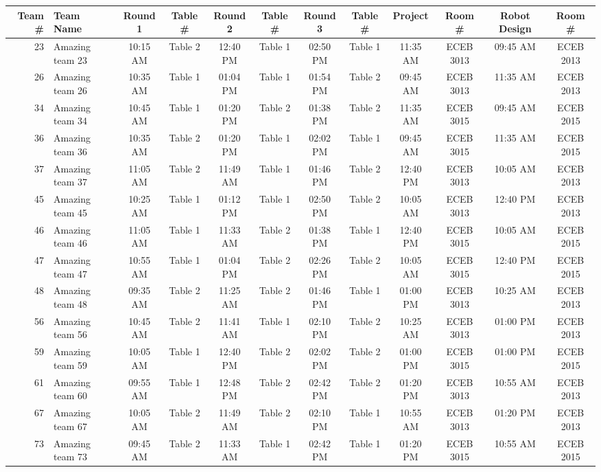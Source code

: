 \documentclass{article}%
\begin{document}
%
\normalsize%
\sffamily%
\def\arraystretch{1.5}%
%
\begin{tabular}{|rl|cc|cc|cc|cc|cc|}%
\hline%
\textbf{Team \#}&\textbf{Team Name}&\textbf{Round 1}&\textbf{Table \#}&\textbf{Round 2}&\textbf{Table \#}&\textbf{Round 3}&\textbf{Table \#}&\textbf{Project}&\textbf{Room \#}&\textbf{Robot Design}&\textbf{Room \#}\\%
\hline%
23&Amazing team 23&10:15 AM&Table 2&12:40 PM&Table 1&02:50 PM&Table 1&11:35 AM&ECEB 3013&09:45 AM&ECEB 2013\\%
\hline%
26&Amazing team 26&10:35 AM&Table 1&01:04 PM&Table 1&01:54 PM&Table 2&09:45 AM&ECEB 3013&11:35 AM&ECEB 2013\\%
\hline%
34&Amazing team 34&10:45 AM&Table 1&01:20 PM&Table 2&01:38 PM&Table 2&11:35 AM&ECEB 3015&09:45 AM&ECEB 2015\\%
\hline%
36&Amazing team 36&10:35 AM&Table 2&01:20 PM&Table 1&02:02 PM&Table 1&09:45 AM&ECEB 3015&11:35 AM&ECEB 2015\\%
\hline%
37&Amazing team 37&11:05 AM&Table 2&11:49 AM&Table 1&01:46 PM&Table 2&12:40 PM&ECEB 3013&10:05 AM&ECEB 2013\\%
\hline%
45&Amazing team 45&10:25 AM&Table 1&01:12 PM&Table 1&02:50 PM&Table 2&10:05 AM&ECEB 3013&12:40 PM&ECEB 2013\\%
\hline%
46&Amazing team 46&11:05 AM&Table 1&11:33 AM&Table 2&01:38 PM&Table 1&12:40 PM&ECEB 3015&10:05 AM&ECEB 2015\\%
\hline%
47&Amazing team 47&10:55 AM&Table 1&01:04 PM&Table 2&02:26 PM&Table 2&10:05 AM&ECEB 3015&12:40 PM&ECEB 2015\\%
\hline%
48&Amazing team 48&09:35 AM&Table 2&11:25 AM&Table 2&01:46 PM&Table 1&01:00 PM&ECEB 3013&10:25 AM&ECEB 2013\\%
\hline%
56&Amazing team 56&10:45 AM&Table 2&11:41 AM&Table 1&02:10 PM&Table 2&10:25 AM&ECEB 3013&01:00 PM&ECEB 2013\\%
\hline%
59&Amazing team 59&10:05 AM&Table 1&12:40 PM&Table 2&02:02 PM&Table 2&01:00 PM&ECEB 3015&01:00 PM&ECEB 2015\\%
\hline%
61&Amazing team 60&09:55 AM&Table 1&12:48 PM&Table 2&02:42 PM&Table 2&01:20 PM&ECEB 3013&10:55 AM&ECEB 2013\\%
\hline%
67&Amazing team 67&10:05 AM&Table 2&11:49 AM&Table 2&02:10 PM&Table 1&10:55 AM&ECEB 3013&01:20 PM&ECEB 2013\\%
\hline%
73&Amazing team 73&09:45 AM&Table 2&11:33 AM&Table 1&02:42 PM&Table 1&01:20 PM&ECEB 3015&10:55 AM&ECEB 2015\\%

\end{tabular}
\end{document}
